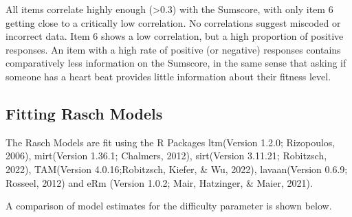 \documentclass[
  man,floatsintext]{apa6}
\begin{document}
All items correlate highly enough (\textgreater0.3) with the Sumscore, with only item 6 getting close to a critically low correlation. No correlations suggest miscoded or incorrect data.
Item 6 shows a low correlation, but a high proportion of positive responses. An item with a high rate of positive (or negative) responses contains comparatively less information on the Sumscore, in the same sense that asking if someone has a heart beat provides little information about their fitness level.

\hypertarget{fitting-rasch-models}{%
\subsection{Fitting Rasch Models}\label{fitting-rasch-models}}

The Rasch Models are fit using the R Packages ltm(Version 1.2.0; Rizopoulos, 2006), mirt(Version 1.36.1; Chalmers, 2012), sirt(Version 3.11.21; Robitzsch, 2022), TAM(Version 4.0.16;Robitzsch, Kiefer, \& Wu, 2022), lavaan(Version 0.6.9; Rosseel, 2012) and eRm (Version 1.0.2; Mair, Hatzinger, \& Maier, 2021).

A comparison of model estimates for the difficulty parameter is shown below.

\tiny
\begin{table}[H]
\centering\begingroup\fontsize{7}{9}\selectfont

\endgroup{}
\end{table}
\normalsize
\end{document}

